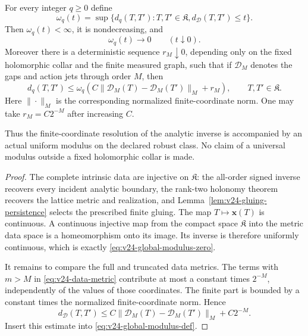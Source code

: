 \begin{theorem}
\label{thm:v24-global-modulus}
For every integer \(q\ge0\) define
\begin{equation}\label{eq:v24-global-modulus-def}
 \omega_q(t)=
 \sup\{d_q(T,T'):T,T'\in\mathfrak K,
                         d_{\mathcal D}(T,T')\le t\}.
\end{equation}
Then \(\omega_q(t)<\infty\), it is nondecreasing, and
\begin{equation}\label{eq:v24-global-modulus-zero}
                         \omega_q(t)\longrightarrow0
                         \qquad(t\downarrow0).
\end{equation}
Moreover there is a deterministic sequence \(r_M\downarrow0\), depending
only on the fixed holomorphic collar and the finite measured graph, such that
if \(\mathcal D_M\) denotes the gaps and action jets through order \(M\), then
\begin{equation}\label{eq:v24-finite-modulus}
 d_q(T,T')
 \le
 \omega_q\!\left(
   C\|\mathcal D_M(T)-\mathcal D_M(T')\|_{M}+r_M
              \right),
 \qquad T,T'\in\mathfrak K.
\end{equation}
Here \(\|\cdot\|_M\) is the corresponding normalized finite-coordinate norm.
One may take \(r_M=C2^{-M}\) after increasing \(C\).

Thus the finite-coordinate resolution of the analytic inverse is accompanied
by an actual uniform modulus on the declared robust class.  No claim of a
universal modulus outside a fixed holomorphic collar is made.
\end{theorem}

\begin{proof}
The complete intrinsic data are injective on \(\mathfrak K\): the all-order
signed inverse recovers every incident analytic boundary, the rank-two
holonomy theorem recovers the lattice metric and realization, and
Lemma~\ref{lem:v24-gluing-persistence} selects the prescribed finite gluing.
The map \(T\mapsto\mathbf x(T)\) is continuous.  A continuous injective map
from the compact space \(\mathfrak K\) into the metric data space is a
homeomorphism onto its image.  Its inverse is therefore uniformly continuous,
which is exactly \eqref{eq:v24-global-modulus-zero}.

It remains to compare the full and truncated data metrics.  The terms with
\(m>M\) in \eqref{eq:v24-data-metric} contribute at most a constant times
\(2^{-M}\), independently of the values of those coordinates.  The finite
part is bounded by a constant times the normalized finite-coordinate norm.
Hence
\[
 d_{\mathcal D}(T,T')
 \le C\|\mathcal D_M(T)-\mathcal D_M(T')\|_M+C2^{-M}.
\]
Insert this estimate into \eqref{eq:v24-global-modulus-def}.
\end{proof}

